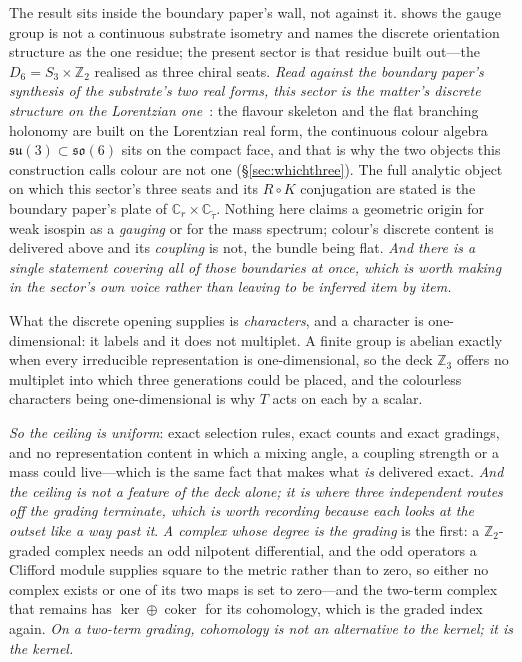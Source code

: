 \documentclass[11pt]{article}
\newcommand{\su}{\mathfrak{su}}
\newcommand{\so}{\mathfrak{so}}
\begin{document}
The result sits inside the boundary paper's wall, not against it. \cite{JanzenBoundary} shows the gauge group is not a continuous substrate isometry and names the discrete orientation structure as the one residue; the present sector is that residue built out---the $D_6=S_3\times\mathbb{Z}_2$ realised as three chiral seats. \emph{Read against the boundary paper's synthesis of the substrate's two real forms, this sector is the matter's discrete structure on the Lorentzian one}~\cite{JanzenBoundary}: the flavour skeleton and the flat branching holonomy are built on the Lorentzian real form, the continuous colour algebra $\su(3)\subset\so(6)$ sits on the compact face, and that is why the two objects this construction calls colour are not one (\S\ref{sec:whichthree}). The full analytic object on which this sector's three seats and its $R\circ K$ conjugation are stated is the boundary paper's plate of $\mathbb{C}_{r}\times\mathbb{C}_{\tilde\tau}$. Nothing here claims a geometric origin for weak isospin as a \emph{gauging} or for the mass spectrum; colour's discrete content is delivered above and its \emph{coupling} is not, the bundle being flat. \emph{And there is a single statement covering all of those boundaries at once, which is worth making in the sector's own voice rather than leaving to be inferred item by item.} 

What the discrete opening supplies is \emph{characters}, and a character is one-dimensional: it labels and it does not multiplet. A finite group is abelian exactly when every irreducible representation is one-dimensional, so the deck $\mathbb{Z}_3$ offers no multiplet into which three generations could be placed, and the colourless characters being one-dimensional is why $T$ acts on each by a scalar. 

\emph{So the ceiling is uniform}: exact selection rules, exact counts and exact gradings, and no representation content in which a mixing angle, a coupling strength or a mass could live---which is the same fact that makes what \emph{is} delivered exact. \emph{And the ceiling is not a feature of the deck alone; it is where three
independent routes off the grading terminate, which is worth recording because each looks at the outset
like a way past it}. \emph{A
complex whose degree is the grading} is the first: a $\mathbb{Z}_2$-graded complex needs an odd
nilpotent differential, and the odd operators a Clifford module supplies square to the metric rather
than to zero, so either no complex exists or one of its two maps is set to zero---and the two-term
complex that remains has $\ker\oplus\operatorname{coker}$ for its cohomology, which is the graded index
again. \emph{On a two-term grading, cohomology is not an alternative to the kernel; it is the kernel.}
\end{document}
